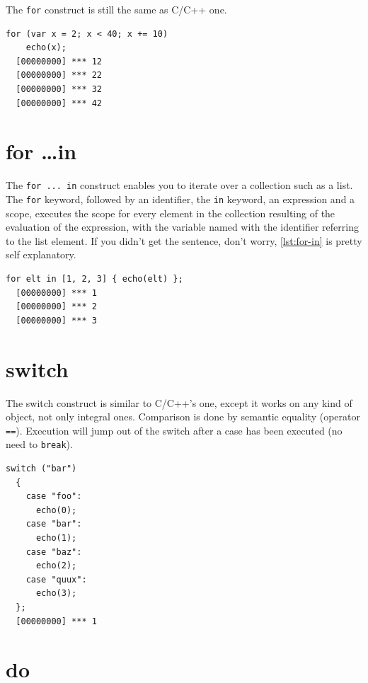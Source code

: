 \documentclass[openright,twoside,12pt]{report}
\newcommand{\C}{C\xspace}
\newcommand{\Cxx}{C++\xspace}
\newcommand{\lst}[1]{\autoref{lst:#1}}
\begin{document}
The \texttt{for} construct is still the same as \C/\Cxx one.

\begin{lstlisting}[caption=Nihil novi sub sole, label=lst:for]
  for (var x = 2; x < 40; x += 10)
    echo(x);
  [00000000] *** 12
  [00000000] *** 22
  [00000000] *** 32
  [00000000] *** 42
\end{lstlisting}

\section{for \ldots in}

The \texttt{for ... in} construct enables you to iterate over a
collection such as a list. The \texttt{for} keyword, followed by an
identifier, the \texttt{in} keyword, an expression and a scope,
executes the scope for every element in the collection resulting of
the evaluation of the expression, with the variable named with the
identifier referring to the list element. If you didn't get the
sentence, don't worry, \lst{for-in} is pretty self explanatory.

\begin{lstlisting}[caption=Collection iteration with \texttt{for},
  label=lst:for-in]
  for elt in [1, 2, 3] { echo(elt) };
  [00000000] *** 1
  [00000000] *** 2
  [00000000] *** 3
\end{lstlisting}

\section{switch}

The switch construct is similar to \C/\Cxx's one, except it works on
any kind of object, not only integral ones. Comparison is done by
semantic equality (operator \texttt{==}). Execution will jump out of
the switch after a case has been executed (no need to \texttt{break}).

\begin{lstlisting}[caption=The \texttt{switch} construct,
  label=switch]
  switch ("bar")
  {
    case "foo":
      echo(0);
    case "bar":
      echo(1);
    case "baz":
      echo(2);
    case "quux":
      echo(3);
  };
  [00000000] *** 1
\end{lstlisting}

\section{do}
\label{section:constructs/do}
\end{document}
